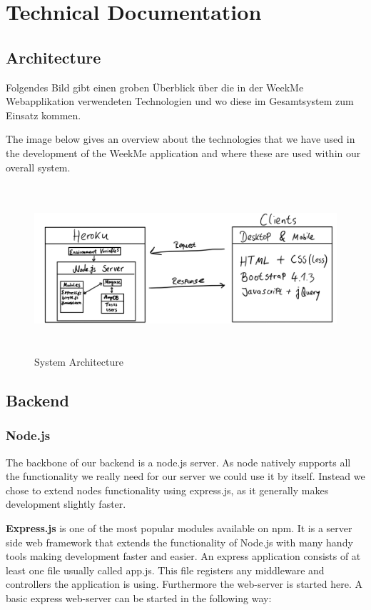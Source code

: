 \section{Technical Documentation}

\subsection{Architecture} 
Folgendes Bild gibt einen groben Überblick über die in der WeekMe Webapplikation verwendeten Technologien und wo diese im Gesamtsystem zum Einsatz kommen. 
 
The image below gives an overview about the technologies that we have used in the development of the WeekMe application and where these are used within our overall system.  

	\begin{figure}[H] 
		\centering 
		\includegraphics[height=6.2cm]{figures/architecture}    
		\caption{System Architecture}     
	\end{figure}  
 
\subsection{Backend} 

\subsubsection{Node.js}
The backbone of our backend is a node.js server. As node natively supports all the functionality we really need for our server we could use it by itself. Instead we chose to extend nodes functionality using express.js, as it generally makes development slightly faster.  




\textbf{Express.js}  is one of the most popular modules available on npm. It is a server side web framework that extends the functionality of Node.js with many handy tools making development faster and easier. An express application consists of at least one file usually called app.js. This file registers any middleware and controllers the application is using. Furthermore the web-server is started here. A basic express web-server can be started in the following way:  

